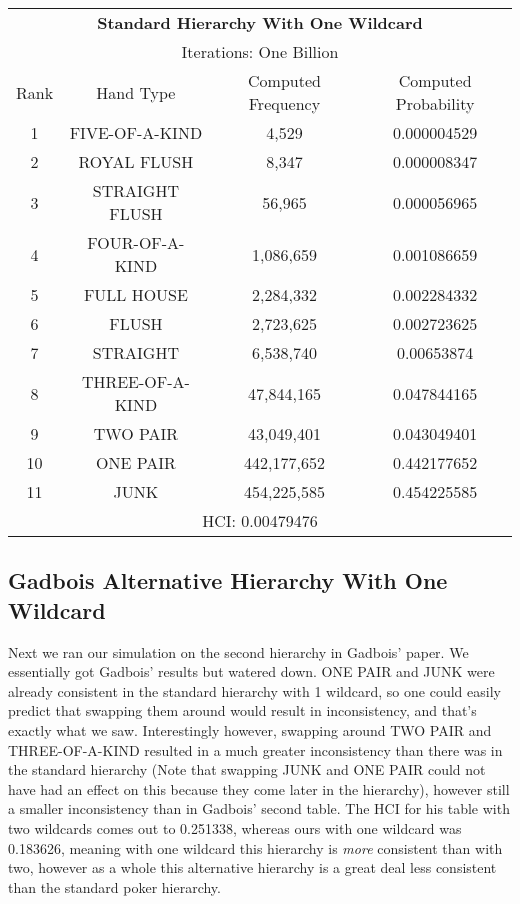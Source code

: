 \documentclass[16pt]{article}
\begin{document}
\begin{center}
\begin{tabular}{ |c c c c|} 
\hline
\multicolumn{4}{|c|}{\textbf{Standard Hierarchy With One Wildcard}} \\
\multicolumn{4}{|c|}{Iterations: One Billion} \\
 \hline
 Rank & Hand Type & Computed Frequency & Computed Probability \\ 
 \hline
 1 & FIVE-OF-A-KIND & 4,529 & 0.000004529\\ 
 2 & ROYAL FLUSH & 8,347 & 0.000008347\\ 
 3 & STRAIGHT FLUSH & 56,965 & 0.000056965\\
 4 & FOUR-OF-A-KIND & 1,086,659 & 0.001086659\\
 5 & FULL HOUSE & 2,284,332 & 0.002284332\\
 6 & FLUSH & 2,723,625 & 0.002723625\\
 7 & STRAIGHT & 6,538,740 & 0.00653874\\
 8 & THREE-OF-A-KIND & 47,844,165 & 0.047844165\\
 9 & TWO PAIR & 43,049,401 & 0.043049401\\
 10 & ONE PAIR & 442,177,652 & 0.442177652\\
 11 & JUNK & 454,225,585 & 0.454225585\\
 \hline
 \multicolumn{4}{|c|}{HCI: 0.00479476} \\
 \hline
\end{tabular}
\end{center}

\subsection{Gadbois Alternative Hierarchy With One Wildcard}
Next we ran our simulation on the second hierarchy in Gadbois' paper. We essentially got Gadbois' results but watered down. ONE PAIR and JUNK were already consistent in the standard hierarchy with 1 wildcard, so one could easily predict that swapping them around would result in inconsistency, and that's exactly what we saw. Interestingly however, swapping around TWO PAIR and THREE-OF-A-KIND resulted in a much greater inconsistency than there was in the standard hierarchy (Note that swapping JUNK and ONE PAIR could not have had an effect on this because they come later in the hierarchy), however still a smaller inconsistency than in Gadbois' second table. The HCI for his table with two wildcards comes out to 0.251338, whereas ours with one wildcard was 0.183626, meaning with one wildcard this hierarchy is \textit{more} consistent than with two, however as a whole this alternative hierarchy is a great deal less consistent than the standard poker hierarchy. 
\end{document}

